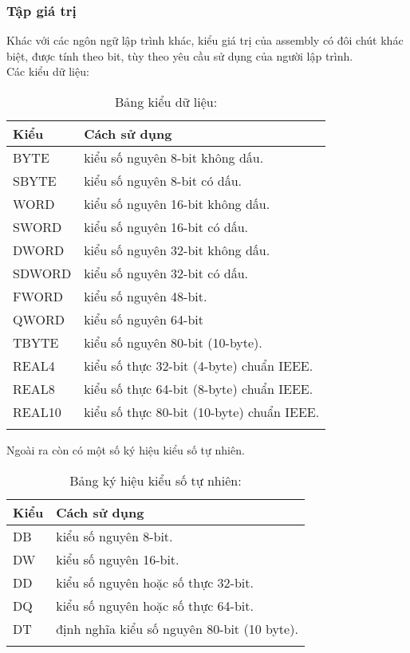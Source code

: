 		\subsubsection{Tập giá trị}
		Khác với các ngôn ngữ lập trình khác, kiểu giá trị của assembly có đôi chút khác biệt, được tính theo bit, tùy theo yêu cầu sử dụng của người lập trình. \\
		Các kiểu dữ liệu:
		\begin{longtable}{ | m{3cm} | m{8cm} | }
			\hline
				Kiểu & Cách sử dụng\\
			\hline
			\hline
				BYTE & 	kiểu số nguyên 8-bit không dấu.\\
			\hline
				SBYTE	& kiểu số nguyên 8-bit có dấu.\\
			\hline
				WORD& 	kiểu số nguyên 16-bit không dấu.\\
			\hline
				SWORD	& kiểu số nguyên 16-bit có dấu.\\
			\hline
				DWORD& 	kiểu số nguyên 32-bit không dấu.\\
			\hline
				SDWORD& 	kiểu số nguyên 32-bit có dấu.\\
			\hline
				FWORD	& kiểu số nguyên 48-bit.\\
			\hline
				QWORD& 	kiểu số nguyên 64-bit\\
			\hline
				TBYTE& 	kiểu số nguyên 80-bit (10-byte).\\
			\hline
				REAL4& 	kiểu số thực 32-bit (4-byte) chuẩn IEEE.\\
			\hline
				REAL8& 	kiểu số thực 64-bit (8-byte) chuẩn IEEE.\\
			\hline
				REAL10& 	kiểu số thực 80-bit (10-byte) chuẩn IEEE.\\			
			\hline
					\caption{Bảng kiểu dữ liệu:}
					\label{table:tbkieudulieu}
		\end{longtable}
		
		Ngoài ra còn có một số ký hiệu kiểu số tự nhiên.
		\begin{longtable}{ | m{3cm} | m{6cm} | }
			\hline
				Kiểu & Cách sử dụng\\
			\hline
			\hline
				DB &	kiểu số nguyên 8-bit.\\
			\hline
				DW &	kiểu số nguyên 16-bit.\\
			\hline			
				DD &	kiểu số nguyên hoặc số thực 32-bit.\\
			\hline
				DQ	 &kiểu số nguyên hoặc số thực 64-bit.\\
			\hline
				DT	 &định nghĩa kiểu số nguyên 80-bit (10 byte).\\
			\hline
					\caption{Bảng ký hiệu kiểu số tự nhiên:}
					\label{table:tbkieudulieutn}
		\end{longtable}
		
